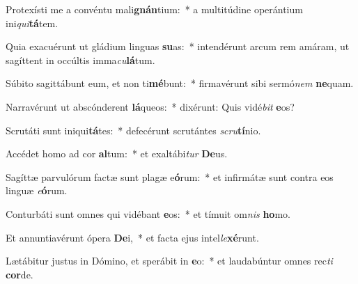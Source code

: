 \item Protexísti me a convéntu mali\textbf{gnán}tium:~* a multitúdine operántium ini\textit{qui}\textbf{tá}tem.
\item Quia exacuérunt ut gládium linguas \textbf{su}as:~* intendérunt arcum rem amáram, ut sagíttent in occúltis imma\textit{cu}\textbf{lá}tum.
\item Súbito sagittábunt eum, et non ti\textbf{mé}bunt:~* firmavérunt sibi sermó\textit{nem} \textbf{ne}quam.
\item Narravérunt ut abscónderent \textbf{lá}queos:~* dixérunt: Quis vidé\textit{bit} \textbf{e}os?
\item Scrutáti sunt iniqui\textbf{tá}tes:~* defecérunt scrutántes \textit{scru}\textbf{tí}nio.
\item Accédet homo ad cor \textbf{al}tum:~* et exaltábi\textit{tur} \textbf{De}us.
\item Sagíttæ parvulórum factæ sunt plagæ e\textbf{ó}rum:~* et infirmátæ sunt contra eos linguæ \textit{e}\textbf{ó}rum.
\item Conturbáti sunt omnes qui vidébant \textbf{e}os:~* et tímuit om\textit{nis} \textbf{ho}mo.
\item Et annuntiavérunt ópera \textbf{De}i,~* et facta ejus intel\textit{le}\textbf{xé}runt.
\item Lætábitur justus in Dómino, et sperábit in \textbf{e}o:~* et laudabúntur omnes rec\textit{ti} \textbf{cor}de.
